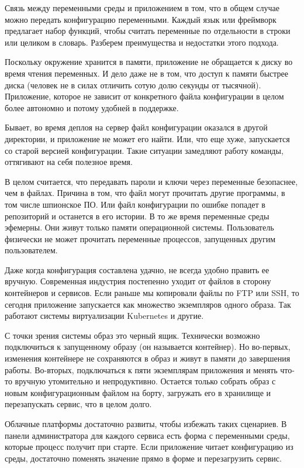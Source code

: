 Связь между переменными среды и приложением в том, что в общем случае можно
передать конфигурацию переменными. Каждый язык или фреймворк предлагает набор
функций, чтобы считать переменные по отдельности в строки или целиком в
словарь. Разберем преимущества и недостатки этого подхода.

Поскольку окружение хранится в памяти, приложение не обращается к диску во время
чтения переменных. И дело даже не в том, что доступ к памяти быстрее диска
(человек не в силах отличить сотую долю секунды от тысячной). Приложение,
которое не зависит от конкретного файла конфигурации в целом более автономно и
потому удобней в поддержке.

Бывает, во время деплоя на сервер файл конфигурации оказался в другой
директории, и приложение не может его найти. Или, что еще хуже, запускается со
старой версией конфигурации. Такие ситуации замедляют работу команды, оттягивают
на себя полезное время.

В целом считается, что передавать пароли и ключи через переменные безопаснее,
чем в файлах. Причина в том, что файл могут прочитать другие программы, в том
числе шпионское ПО. Или файл конфигурации по ошибке попадет в репозиторий и
останется в его истории. В то же время переменные среды эфемерны. Они живут
только памяти операционной системы. Пользователь физически не может прочитать
переменные процессов, запущенных другим пользователем.

Даже когда конфигурация составлена удачно, не всегда удобно править ее
вручную. Современная индустрия постепенно уходит от файлов в сторону контейнеров
и сервисов. Если раньше мы копировали файлы по FTP или SSH, то сегодня
приложение запускается как множество экземпляров одного образа. Так работают
системы виртуализации Kubernetes и другие.

С точки зрения системы образ это черный ящик. Технически возможно подключиться к
запущенному образу (он называется контейнер). Но во-первых, изменения контейнере
не сохраняются в образ и живут в памяти до завершения работы. Во-вторых,
подключаться к пяти экземплярам приложения и менять что-то вручную утомительно и
непродуктивно. Остается только собрать образ с новым конфигурационным файлом на
борту, загружать его в хранилище и перезапускать сервис, что в целом долго.

Облачные платформы достаточно развиты, чтобы избежать таких сценариев. В панели
администратора для каждого сервиса есть форма с переменными среды, которые
процесс получит при старте. Если приложение читает конфигурацию из среды,
достаточно поменять значение прямо в форме и перезагрузить сервис.

